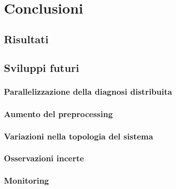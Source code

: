 \chapter{Conclusioni}
\section{Risultati}

\section{Sviluppi futuri}

\subsection{Parallelizzazione della diagnosi distribuita}

\subsection{Aumento del preprocessing}

\subsection{Variazioni nella topologia del sistema}

\subsection{Osservazioni incerte}

\subsection{Monitoring}